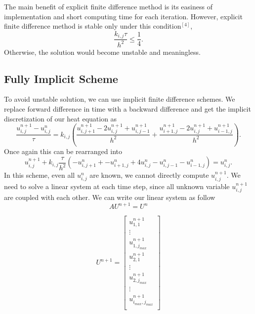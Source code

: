 \documentclass[10pt,a4paper]{report}
\begin{document}
The main benefit of explicit finite difference method is its easiness of implementation and short computing time for each iteration. However, explicit finite difference method is stable only under this condition$^{[4]}$,
\begin{equation}
{\frac{k_{i,j}\tau}{h^2}}\leq {\frac{1}{4}}.
\end{equation}
Otherwise, the solution would become unstable and meaningless.\\


\subsection{Fully Implicit Scheme}

To avoid unstable solution, we can use implicit finite difference schemes. We replace forward difference in time with a backward difference and get the implicit discretization of our heat equation as
\begin{equation}
{\frac{u^{n+1}_{i,j}-u^n_{i,j}}{\tau}}=k_{i,j}({\frac{u^{n+1}_{i,j+1}-2u^{n+1}_{i,j}+u^{n+1}_{i,j-1}}{h^2}}+{\frac{u^{n+1}_{i+1,j}-2u^{n+1}_{i,j}+u^{n+1}_{i-1,j}}{h^2}}).
\end{equation}
Once again this can be rearranged into
\begin{equation}
u^{n+1}_{i,j}+k_{i,j}{\frac{\tau}{h^2}}(-u^n_{i,j+1}+-u^n_{i+1,j}+4u^n_{i,j}-u^n_{i,j-1}-u^n_{i-1,j})=u^{n}_{i,j}.
\end{equation}
In this scheme, even all $u^n_{i,j}$ are known, we cannot directly compute $u^{n+1}_{i,j} $. We need to solve a linear system at each time step, since all unknown variable $u^{n+1}_{i,j}$ are coupled with each other. We can write our linear system as follow \[\] 
\begin{equation}
AU^{n+1}=U^{n}
\end{equation}

\begin{equation}
U^{n+1}=\begin{bmatrix}
u^{n+1}_{1,1}\\
\vdots\\
u^{n+1}_{1,j_{max}}\\
u^{n+1}_{2,1}\\
\vdots\\
u^{n+1}_{2,j_{max}}\\
\vdots\\
u^{n+1}_{i_{max},j_{max}}\\
\end{bmatrix}
\end{equation}
\[
\]
\end{document}
